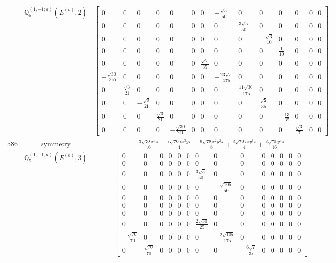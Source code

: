 \documentclass[fleqn,8pt,landscape]{jsarticle}
\begin{document}
\begin{longtable}{ccc}
$  $ & $ \mathbb{Q}_{5}^{(1,-1;a)}(E^{(b)},2) $ & $ \begin{bmatrix} 0 & 0 & 0 & 0 & 0 & 0 & 0 & - \frac{\sqrt{5}}{50} & 0 & 0 & 0 & 0 & 0 & 0 \\ 0 & 0 & 0 & 0 & 0 & 0 & 0 & 0 & \frac{3 \sqrt{5}}{50} & 0 & 0 & 0 & 0 & 0 \\ 0 & 0 & 0 & 0 & 0 & 0 & 0 & 0 & 0 & - \frac{\sqrt{3}}{10} & 0 & 0 & 0 & 0 \\ 0 & 0 & 0 & 0 & 0 & 0 & 0 & 0 & 0 & 0 & \frac{1}{10} & 0 & 0 & 0 \\ 0 & 0 & 0 & 0 & 0 & 0 & \frac{\sqrt{7}}{35} & 0 & 0 & 0 & 0 & 0 & 0 & 0 \\ - \frac{\sqrt{30}}{210} & 0 & 0 & 0 & 0 & 0 & 0 & - \frac{23 \sqrt{5}}{175} & 0 & 0 & 0 & 0 & 0 & 0 \\ 0 & \frac{\sqrt{3}}{21} & 0 & 0 & 0 & 0 & 0 & 0 & \frac{11 \sqrt{30}}{175} & 0 & 0 & 0 & 0 & 0 \\ 0 & 0 & - \frac{\sqrt{6}}{21} & 0 & 0 & 0 & 0 & 0 & 0 & \frac{\sqrt{2}}{35} & 0 & 0 & 0 & 0 \\ 0 & 0 & 0 & \frac{\sqrt{3}}{21} & 0 & 0 & 0 & 0 & 0 & 0 & - \frac{13}{35} & 0 & 0 & 0 \\ 0 & 0 & 0 & 0 & - \frac{\sqrt{30}}{210} & 0 & 0 & 0 & 0 & 0 & 0 & \frac{\sqrt{3}}{7} & 0 & 0 \end{bmatrix} $ \\ \hline
$ 586 $ & $ \text{symmetry} $ & $ \frac{3 \sqrt{70} x^{4} z}{16} - \frac{3 \sqrt{70} i x^{3} y z}{4} - \frac{9 \sqrt{70} x^{2} y^{2} z}{8} + \frac{3 \sqrt{70} i x y^{3} z}{4} + \frac{3 \sqrt{70} y^{4} z}{16} $ \\
$  $ & $ \mathbb{Q}_{5}^{(1,-1;a)}(E^{(b)},3) $ & $ \begin{bmatrix} 0 & 0 & 0 & 0 & 0 & 0 & 0 & 0 & 0 & 0 & 0 & 0 & 0 & 0 \\ 0 & 0 & 0 & 0 & 0 & 0 & 0 & 0 & 0 & 0 & 0 & 0 & 0 & 0 \\ 0 & 0 & 0 & 0 & 0 & 0 & \frac{3 \sqrt{5}}{50} & 0 & 0 & 0 & 0 & 0 & 0 & 0 \\ 0 & 0 & 0 & 0 & 0 & 0 & 0 & - \frac{\sqrt{105}}{50} & 0 & 0 & 0 & 0 & 0 & 0 \\ 0 & 0 & 0 & 0 & 0 & 0 & 0 & 0 & 0 & 0 & 0 & 0 & 0 & 0 \\ 0 & 0 & 0 & 0 & 0 & 0 & 0 & 0 & 0 & 0 & 0 & 0 & 0 & 0 \\ 0 & 0 & 0 & 0 & 0 & 0 & 0 & 0 & 0 & 0 & 0 & 0 & 0 & 0 \\ 0 & 0 & 0 & 0 & 0 & 0 & \frac{2 \sqrt{30}}{25} & 0 & 0 & 0 & 0 & 0 & 0 & 0 \\ - \frac{\sqrt{70}}{70} & 0 & 0 & 0 & 0 & 0 & 0 & - \frac{2 \sqrt{105}}{175} & 0 & 0 & 0 & 0 & 0 & 0 \\ 0 & \frac{\sqrt{70}}{70} & 0 & 0 & 0 & 0 & 0 & 0 & - \frac{6 \sqrt{7}}{35} & 0 & 0 & 0 & 0 & 0 \end{bmatrix} $ \\ \hline

\end{longtable}
\end{document}
